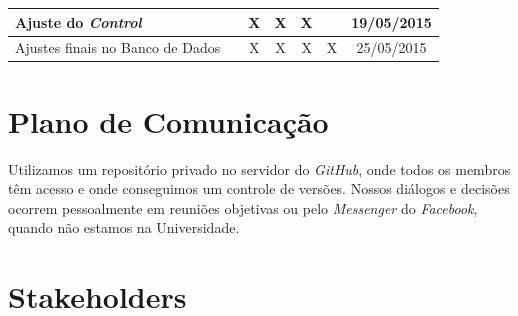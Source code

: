 \documentclass[a4paper,12pt]{article}
\begin{document}
\begin{longtable}{|p{3cm}|c|c|c|c|c|c|}
Ajuste do \textit{Control}                        &                                          & X                                      & X                                     & X                                      &                                       & 19/05/2015                                \\ \hline
Ajustes finais no Banco de Dados          &                                          & X                                      & X                                     & X                                      & X                                     & 25/05/2015                                \\ \hline

\end{longtable}



\newpage
\section{Plano de Comunicação}
Utilizamos um repositório privado no servidor do \textit{GitHub}, onde todos os membros têm acesso e onde conseguimos um controle de versões.
Nossos diálogos e decisões ocorrem pessoalmente em reuniões objetivas ou pelo \textit{Messenger} do \textit{Facebook}, quando não estamos na Universidade.




\section{Stakeholders}
\end{document}
